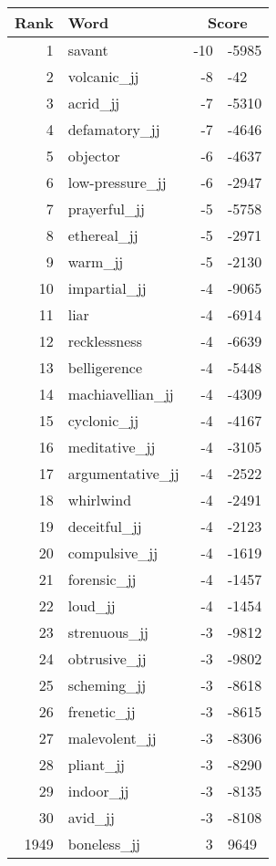 \begin{longtable}[!htbp]{| rlr@{.}l |}
    \hline
    \textbf{Rank} & \textbf{Word} & \multicolumn{2}{c|}{\textbf{Score}} \\
    \hline
    \endhead
    1 & savant & -10 & -5985 \\
    2 & volcanic\_jj & -8 & -42 \\
    3 & acrid\_jj & -7 & -5310 \\
    4 & defamatory\_jj & -7 & -4646 \\
    5 & objector & -6 & -4637 \\
    6 & low-pressure\_jj & -6 & -2947 \\
    7 & prayerful\_jj & -5 & -5758 \\
    8 & ethereal\_jj & -5 & -2971 \\
    9 & warm\_jj & -5 & -2130 \\
    10 & impartial\_jj & -4 & -9065 \\
    11 & liar & -4 & -6914 \\
    12 & recklessness & -4 & -6639 \\
    13 & belligerence & -4 & -5448 \\
    14 & machiavellian\_jj & -4 & -4309 \\
    15 & cyclonic\_jj & -4 & -4167 \\
    16 & meditative\_jj & -4 & -3105 \\
    17 & argumentative\_jj & -4 & -2522 \\
    18 & whirlwind & -4 & -2491 \\
    19 & deceitful\_jj & -4 & -2123 \\
    20 & compulsive\_jj & -4 & -1619 \\
    21 & forensic\_jj & -4 & -1457 \\
    22 & loud\_jj & -4 & -1454 \\
    23 & strenuous\_jj & -3 & -9812 \\
    24 & obtrusive\_jj & -3 & -9802 \\
    25 & scheming\_jj & -3 & -8618 \\
    26 & frenetic\_jj & -3 & -8615 \\
    27 & malevolent\_jj & -3 & -8306 \\
    28 & pliant\_jj & -3 & -8290 \\
    29 & indoor\_jj & -3 & -8135 \\
    30 & avid\_jj & -3 & -8108 \\
    1949 & boneless\_jj & 3 & 9649 \\

\end{longtable}
